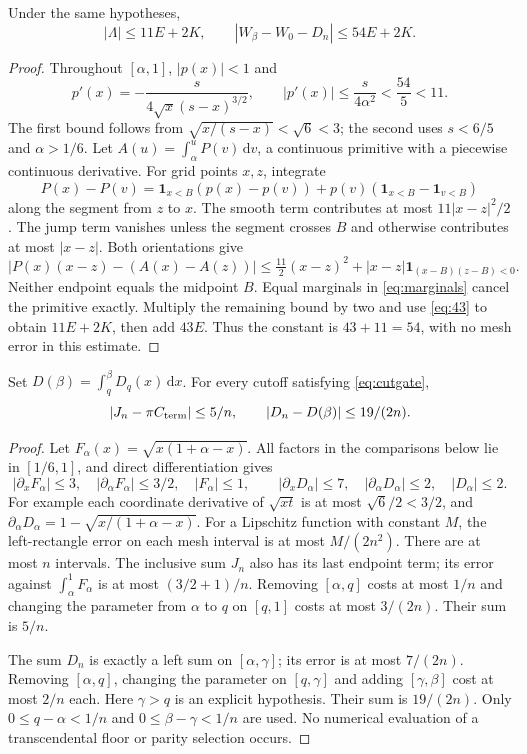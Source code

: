 \documentclass[review,supplement,hidelinks,onefignum,onetabnum]{siamart251216}
\newcommand{\Cterm}{C_{\rm term}}
\newcommand{\ind}{\mathbf 1}
\newcommand{\dd}{\,\mathrm d}
\begin{document}
\begin{lemma}\label{lem:54}
Under the same hypotheses,
\begin{equation}\label{eq:54}
|\Lambda|\le11E+2K,\qquad
|W_\beta-W_0-D_n|\le54E+2K.
\end{equation}
\end{lemma}
\begin{proof}
Throughout $[\alpha,1]$, $|p(x)|<1$ and
\[
p'(x)=-\frac{s}{4\sqrt x(s-x)^{3/2}},\qquad
|p'(x)|\le\frac{s}{4\alpha^2}<\frac{54}{5}<11.
\]
The first bound follows from $\sqrt{x/(s-x)}<\sqrt6<3$;
the second uses $s<6/5$ and $\alpha>1/6$.
Let $A(u)=\int_\alpha^u P(v)\dd v$, a continuous primitive with a
piecewise continuous derivative. For grid points $x,z$, integrate
\[
P(x)-P(v)=\ind_{x<B}(p(x)-p(v))
+p(v)(\ind_{x<B}-\ind_{v<B})
\]
along the segment from $z$ to $x$. The smooth term contributes at most
$11|x-z|^2/2$. The jump term vanishes unless the segment crosses $B$
and otherwise contributes at most $|x-z|$. Both orientations give
\[
|P(x)(x-z)-(A(x)-A(z))|
\le\tfrac{11}{2}(x-z)^2+|x-z|\ind_{(x-B)(z-B)<0}.
\]
Neither endpoint equals the midpoint $B$. Equal marginals in
\eqref{eq:marginals} cancel the primitive exactly. Multiply the remaining
bound by two and use \eqref{eq:43} to obtain $11E+2K$, then add $43E$.
Thus the constant is $43+11=54$, with no mesh error in this estimate.
\end{proof}

\begin{lemma}\label{lem:floors}
Set $D(\beta)=\int_q^\beta D_q(x)\dd x$.
For every cutoff satisfying \eqref{eq:cutgate},
\begin{equation}\label{eq:floorerrors}
|J_n-\pi\Cterm|\le5/n,\qquad |D_n-D(\beta)|\le19/(2n).
\end{equation}
\end{lemma}
\begin{proof}
Let $F_\alpha(x)=\sqrt{x(1+\alpha-x)}$. All factors in the
comparisons below lie in $[1/6,1]$, and direct differentiation gives
\[
|\partial_xF_\alpha|\le3,\quad
|\partial_\alpha F_\alpha|\le3/2,\quad |F_\alpha|\le1,
\qquad
|\partial_xD_\alpha|\le7,\quad
|\partial_\alpha D_\alpha|\le2,\quad |D_\alpha|\le2.
\]
For example each coordinate derivative of $\sqrt{xt}$ is at most
$\sqrt6/2<3/2$, and
$\partial_\alpha D_\alpha=1-\sqrt{x/(1+\alpha-x)}$.
For a Lipschitz function with constant $M$, the left-rectangle error
on each mesh interval is at most $M/(2n^2)$. There are at most $n$
intervals. The inclusive sum $J_n$ also has its last endpoint term;
its error against $\int_\alpha^1F_\alpha$ is at most $(3/2+1)/n$.
Removing $[\alpha,q]$ costs at most $1/n$ and changing the parameter
from $\alpha$ to $q$ on $[q,1]$ costs at most $3/(2n)$. Their sum is $5/n$.

The sum $D_n$ is exactly a left sum on $[\alpha,\gamma]$; its error
is at most $7/(2n)$. Removing $[\alpha,q]$, changing the parameter on
$[q,\gamma]$ and adding $[\gamma,\beta]$ cost at most $2/n$ each.
Here $\gamma>q$ is an explicit hypothesis. Their sum is $19/(2n)$.
Only $0\le q-\alpha<1/n$ and $0\le\beta-\gamma<1/n$ are used.
No numerical evaluation of a transcendental floor or parity selection occurs.
\end{proof}
\end{document}
